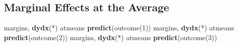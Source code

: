 \documentclass[
]{book}
\newenvironment{Shaded}{\begin{snugshade}}{\end{snugshade}}
\newcommand{\KeywordTok}[1]{\textcolor[rgb]{0.13,0.29,0.53}{\textbf{#1}}}
\newcommand{\NormalTok}[1]{#1}
\begin{document}
\subsection{Marginal Effects at the Average}\label{marginal-effects-at-the-average}

\begin{Shaded}
\begin{Highlighting}[]
\NormalTok{margins, }\KeywordTok{dydx}\NormalTok{(*) atmeans }\KeywordTok{predict}\NormalTok{(outcome(1))}
\NormalTok{margins, }\KeywordTok{dydx}\NormalTok{(*) atmeans }\KeywordTok{predict}\NormalTok{(outcome(2))}
\NormalTok{margins, }\KeywordTok{dydx}\NormalTok{(*) atmeans }\KeywordTok{predict}\NormalTok{(outcome(3))}
\end{Highlighting}
\end{Shaded}
\end{document}
